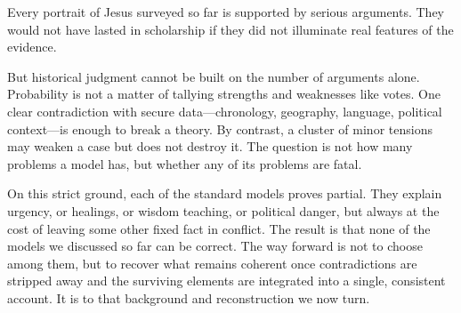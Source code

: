 \medskip

Every portrait of Jesus surveyed so far is supported by serious arguments.
They would not have lasted in scholarship if they did not illuminate real features of the evidence.

But historical judgment cannot be built on the number of arguments alone.
Probability is not a matter of tallying strengths and weaknesses like votes.
One clear contradiction with secure data—chronology, geography, language, political context—is enough to break a theory.
By contrast, a cluster of minor tensions may weaken a case but does not destroy it.
The question is not how many problems a model has, but whether any of its problems are fatal.

On this strict ground, each of the standard models proves partial.
They explain urgency, or healings, or wisdom teaching, or political danger, but always at the cost of leaving some other fixed fact in conflict.
The result is that none of the models we discussed so far can be correct.
The way forward is not to choose among them, but to recover what remains coherent once contradictions are stripped away and the surviving elements are integrated into a single, consistent account.
It is to that background and reconstruction we now turn.
